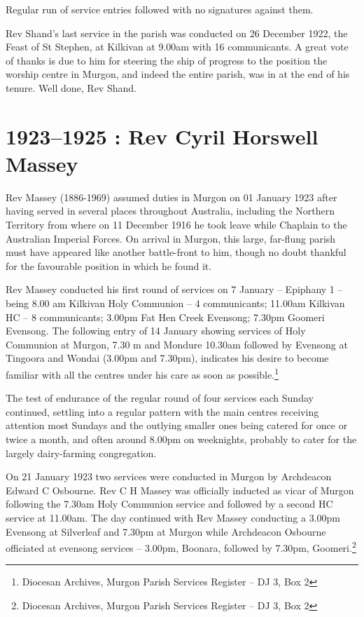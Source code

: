 Regular run of service entries followed with no signatures against them.

Rev Shand's last service in the parish was conducted on 26 December
1922, the Feast of St Stephen, at Kilkivan at 9.00am with 16
communicants. A great vote of thanks is due to him for steering the ship
of progress to the position the worship centre in Murgon, and indeed the
entire parish, was in at the end of his tenure. Well done, Rev Shand.

\begin{quote}
\end{quote}

\printendnotes[custom]
\setcounter{endnote}{0}
\chapter{1923--1925 : Rev Cyril Horswell
Massey}

Rev Massey (1886-1969) assumed duties in Murgon on 01 January 1923 after
having served in several places throughout Australia, including the
Northern Territory from where on 11 December 1916 he took leave while
Chaplain to the Australian Imperial Forces. On arrival in Murgon, this
large, far-flung parish must have appeared like another battle-front to
him, though no doubt thankful for the favourable position in which he
found it.

Rev Massey conducted his first round of services on 7 January --
Epiphany 1 -- being 8.00 am Kilkivan Holy Communion -- 4 communicants;
11.00am Kilkivan HC -- 8 communicants; 3.00pm Fat Hen Creek Evensong;
7.30pm Goomeri Evensong. The following entry of 14 January showing
services of Holy Communion at Murgon, 7.30 m and Mondure 10.30am
followed by Evensong at Tingoora and Wondai (3.00pm and 7.30pm),
indicates his desire to become familiar with all the centres under his
care as soon as possible.\footnote{Diocesan Archives, Murgon Parish
  Services Register -- DJ 3, Box 2}

The test of endurance of the regular round of four services each Sunday
continued, settling into a regular pattern with the main centres
receiving attention most Sundays and the outlying smaller ones being
catered for once or twice a month, and often around 8.00pm on
weeknights, probably to cater for the largely dairy-farming
congregation.

On 21 January 1923 two services were conducted in Murgon by Archdeacon
Edward C Osbourne. Rev C H Massey was officially inducted as vicar of
Murgon following the 7.30am Holy Communion service and followed by a
second HC service at 11.00am. The day continued with Rev Massey
conducting a 3.00pm Evensong at Silverleaf and 7.30pm at Murgon while
Archdeacon Osbourne officiated at evensong services -- 3.00pm, Boonara,
followed by 7.30pm, Goomeri.\footnote{Diocesan Archives, Murgon Parish
  Services Register -- DJ 3, Box 2}

